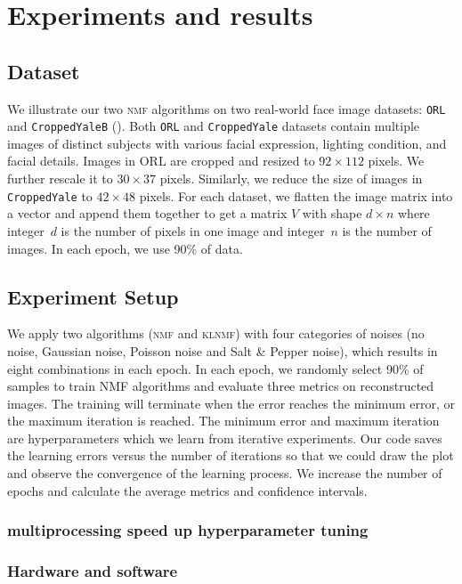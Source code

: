 \section{Experiments and results}\label{chapter4}




\subsection{Dataset}
We illustrate our two \textsc{nmf} algorithms on two real-world face image datasets: \texttt{ORL} and \texttt{CroppedYaleB} (\citet{belhumeur1997eigenfaces}).
Both \texttt{ORL} and \texttt{CroppedYale} datasets contain multiple images of distinct subjects with various facial expression, lighting condition, and facial details.
Images in ORL are cropped and resized to $92 \times 112$ pixels. We further rescale it to $30 \times 37$ pixels. Similarly, we reduce the size of images in \texttt{CroppedYale} to $42 \times 48$ pixels.
For each dataset, we flatten the image matrix into a vector and append them together to get a matrix $V$ with shape $d\times n$ where integer~$d$ is the number of pixels in one image and integer~$n$ is the number of images. In each epoch, we use 90\% of data.

\subsection{Experiment Setup}
We apply two algorithms (\textsc{nmf} and \textsc{klnmf}) with four categories of noises (no noise, Gaussian noise, Poisson noise and Salt \& Pepper noise), which results in eight combinations in each epoch. In each epoch, we randomly select 90\% of samples to train NMF algorithms and evaluate three metrics on reconstructed images. The training will terminate when the error reaches the minimum error, or the maximum iteration is reached. The minimum error and maximum iteration are hyperparameters which we learn from iterative experiments. Our code saves the learning errors versus the number of iterations so that we could draw the plot and observe the convergence of the learning process. We increase the number of epochs and calculate the average metrics and confidence intervals.

\subsubsection{multiprocessing speed up hyperparameter tuning}
\subsubsection{Hardware and software}

